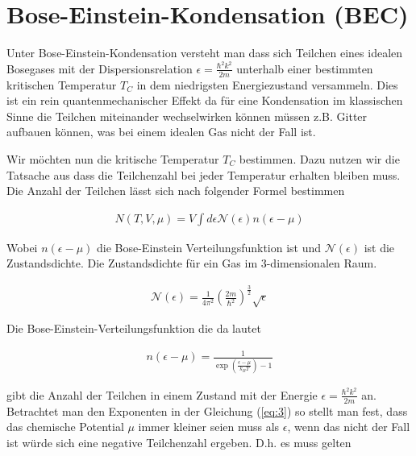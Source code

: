 
\usepackage{amsmath} 





\section*{Bose-Einstein-Kondensation (BEC)}

Unter Bose-Einstein-Kondensation versteht man dass sich Teilchen eines idealen Bosegases mit der Dispersionsrelation \(\epsilon = \frac{\hbar^2 k^2}{2m}\) unterhalb einer bestimmten kritischen Temperatur \(T_C\) in dem niedrigsten Energiezustand versammeln. Dies ist ein rein quantenmechanischer Effekt da für eine Kondensation im klassischen Sinne die Teilchen miteinander wechselwirken können müssen z.B. Gitter aufbauen können, was bei einem idealen Gas nicht der Fall ist.

Wir möchten nun die kritische Temperatur \(T_C\) bestimmen. Dazu nutzen wir die Tatsache aus dass die Teilchenzahl bei jeder Temperatur erhalten bleiben muss. Die Anzahl der Teilchen lässt sich nach folgender Formel bestimmen

\begin{align}
  \label{eq:1}
  N(T,V,\mu) = V\int d\epsilon \mathcal N(\epsilon) n(\epsilon-\mu)
\end{align}

Wobei \( n(\epsilon-\mu) \) die Bose-Einstein Verteilungsfunktion ist und \(\mathcal N(\epsilon)\) ist die Zustandsdichte. Die Zustandsdichte für ein Gas im 3-dimensionalen Raum.

\begin{align}
  \label{eq:2}
  \mathcal N(\epsilon) = \frac{1}{4\pi^2}\left( \frac{2m}{\hbar^2}  \right)^{\frac{3}{2}}\sqrt{\epsilon}
\end{align}

Die Bose-Einstein-Verteilungsfunktion die da lautet

\begin{align}
  \label{eq:3}
  n(\epsilon-\mu) = \frac{1}{\exp\left(\frac{\epsilon-\mu}{k_B T}\right)-1}
\end{align}

gibt die Anzahl der Teilchen in einem Zustand mit der Energie \(\epsilon = \frac{\hbar^2 k^2}{2m}\) an. Betrachtet man den Exponenten in der Gleichung (\ref{eq:3}) so stellt man fest, dass das chemische Potential \(\mu\) immer kleiner seien muss als \(\epsilon\), wenn das nicht der Fall ist würde sich eine negative Teilchenzahl ergeben. D.h. es muss gelten

